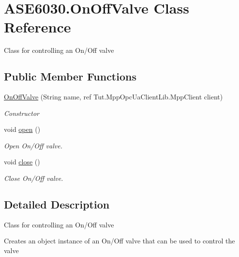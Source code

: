 \hypertarget{class_a_s_e6030_1_1_on_off_valve}{}\section{A\+S\+E6030.\+On\+Off\+Valve Class Reference}
\label{class_a_s_e6030_1_1_on_off_valve}


Class for controlling an On/\+Off valve  


\subsection*{Public Member Functions}
\begin{DoxyCompactItemize}
\item 
\hyperlink{class_a_s_e6030_1_1_on_off_valve_a210880c9d65d53684d468e0290b84772}{On\+Off\+Valve} (String name, ref Tut.\+Mpp\+Opc\+Ua\+Client\+Lib.\+Mpp\+Client client)
\begin{DoxyCompactList}\small\item\em Constructor \end{DoxyCompactList}\item 
\mbox{\label{class_a_s_e6030_1_1_on_off_valve_a682309032082c36a32daa1f7672e4101}} 
void \hyperlink{class_a_s_e6030_1_1_on_off_valve_a682309032082c36a32daa1f7672e4101}{open} ()
\begin{DoxyCompactList}\small\item\em Open On/\+Off valve. \end{DoxyCompactList}\item 
\mbox{\label{class_a_s_e6030_1_1_on_off_valve_a4c878ae2b5970dff941dceb37f0aa863}} 
void \hyperlink{class_a_s_e6030_1_1_on_off_valve_a4c878ae2b5970dff941dceb37f0aa863}{close} ()
\begin{DoxyCompactList}\small\item\em Close On/\+Off valve. \end{DoxyCompactList}\end{DoxyCompactItemize}


\subsection{Detailed Description}
Class for controlling an On/\+Off valve 

Creates an object instance of an On/\+Off valve that can be used to control the valve 


